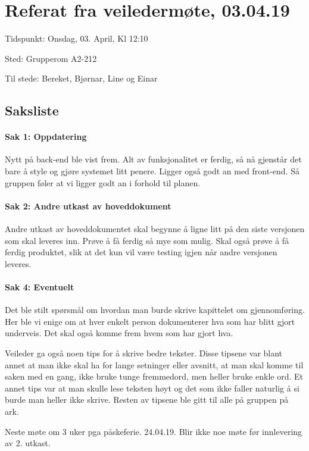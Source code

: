 \chapter{Referat fra veiledermøte, 03.04.19}

Tidspunkt: Onsdag, 03. April, Kl 12:10

Sted: Grupperom A2-212

Til stede: Bereket, Bjørnar, Line og Einar

\section{Saksliste}

\subsubsection{Sak 1: Oppdatering}
Nytt på back-end ble vist frem. Alt av funksjonalitet er ferdig, så nå gjenstår det bare å style og gjøre systemet litt penere. Ligger også godt an med front-end. Så gruppen føler at vi ligger godt an i forhold til planen. 

\subsubsection{Sak 2: Andre utkast av hoveddokument}
Andre utkast av hoveddokumentet skal begynne å ligne litt på den siste versjonen som skal leveres inn. Prøve å få ferdig så mye som mulig. Skal også prøve å få ferdig produktet, slik at det kun vil være testing igjen når andre versjonen leveres.

\subsubsection{Sak 4: Eventuelt}
Det ble stilt spørsmål om hvordan man burde skrive kapittelet om gjennomføring. Her ble vi enige om at hver enkelt person dokumenterer hva som har blitt gjort underveis. Det skal også komme frem hvem som har gjort hva.

Veileder ga også noen tips for å skrive bedre tekster. Disse tipsene var blant annet at man ikke skal ha for lange setninger eller avsnitt, at man skal komme til saken med en gang, ikke bruke tunge fremmedord, men heller bruke enkle ord. Et annet tips var at man skulle lese teksten høyt og det som ikke faller naturlig å si burde man heller ikke skrive. Resten av tipsene ble gitt til alle på gruppen på ark. 

Neste møte om 3 uker pga påskeferie. 24.04.19. Blir ikke noe møte før innlevering av 2. utkast.



